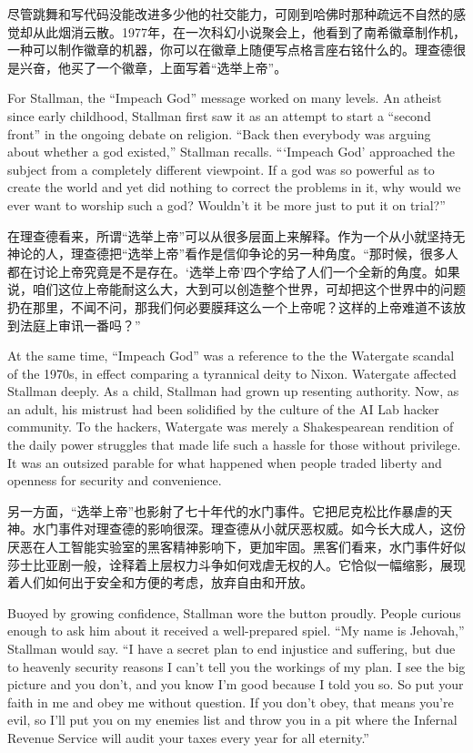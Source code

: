 \ifdefined\chs
尽管跳舞和写代码没能改进多少他的社交能力，可刚到哈佛时那种疏远不自然的感觉却从此烟消云散。1977年，在一次科幻小说聚会上，他看到了南希徽章制作机，一种可以制作徽章的机器，你可以在徽章上随便写点格言座右铭什么的。理查德很是兴奋，他买了一个徽章，上面写着“选举上帝”。
\fi

\ifdefined\eng
For Stallman, the ``Impeach God'' message worked on many levels. An atheist since early childhood, Stallman first saw it as an attempt to start a ``second front'' in the ongoing debate on religion. ``Back then everybody was arguing about whether a god existed,'' Stallman recalls. ```Impeach God' approached the subject from a completely different viewpoint. If a god was so powerful as to create the world and yet did nothing to correct the problems in it, why would we ever want to worship such a god? Wouldn't it be more just to put it on trial?''
\fi

\ifdefined\chs
在理查德看来，所谓“选举上帝”可以从很多层面上来解释。作为一个从小就坚持无神论的人，理查德把“选举上帝”看作是信仰争论的另一种角度。“那时候，很多人都在讨论上帝究竟是不是存在。‘选举上帝’四个字给了人们一个全新的角度。如果说，咱们这位上帝能耐这么大，大到可以创造整个世界，可却把这个世界中的问题扔在那里，不闻不问，那我们何必要膜拜这么一个上帝呢？这样的上帝难道不该放到法庭上审讯一番吗？”
\fi

\ifdefined\eng
At the same time, ``Impeach God'' was a reference to the the Watergate scandal of the 1970s, in effect comparing a tyrannical deity to Nixon.  Watergate affected Stallman deeply. As a child, Stallman had grown up resenting authority. Now, as an adult, his mistrust had been solidified by the culture of the AI Lab hacker community. To the hackers, Watergate was merely a Shakespearean rendition of the daily power struggles that made life such a hassle for those without privilege. It was an outsized parable for what happened when people traded liberty and openness for security and convenience.
\fi

\ifdefined\chs
另一方面，“选举上帝”也影射了七十年代的水门事件。它把尼克松比作暴虐的天神。水门事件对理查德的影响很深。理查德从小就厌恶权威。如今长大成人，这份厌恶在人工智能实验室的黑客精神影响下，更加牢固。黑客们看来，水门事件好似莎士比亚剧一般，诠释着上层权力斗争如何戏虐无权的人。它恰似一幅缩影，展现着人们如何出于安全和方便的考虑，放弃自由和开放。
\fi

\ifdefined\eng
Buoyed by growing confidence, Stallman wore the button proudly. People curious enough to ask him about it received a well-prepared spiel. ``My name is Jehovah,'' Stallman would say. ``I have a secret plan to end injustice and suffering, but due to heavenly security reasons I can't tell you the workings of my plan. I see the big picture and you don't, and you know I'm good because I told you so. So put your faith in me and obey me without question. If you don't obey, that means you're evil, so I'll put you on my enemies list and throw you in a pit where the Infernal Revenue Service will audit your taxes every year for all eternity.''
\fi


